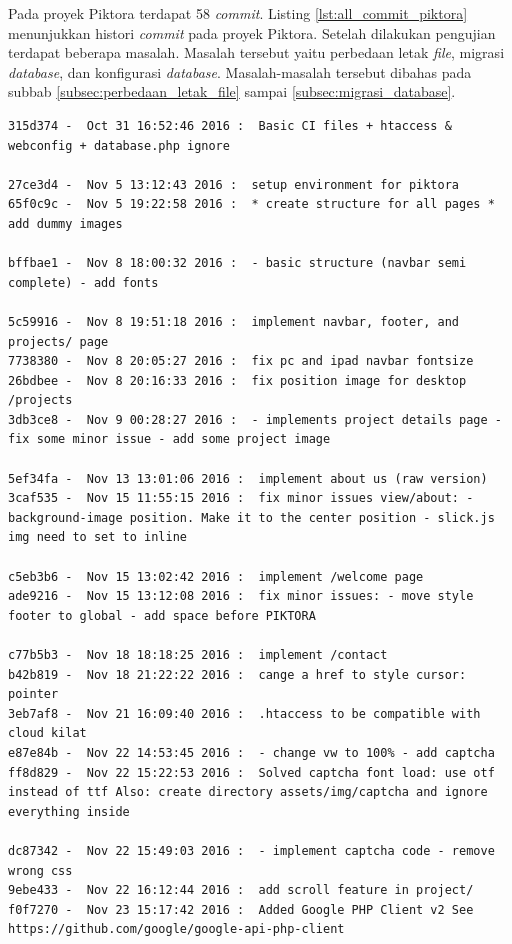 Pada proyek Piktora terdapat 58 \textit{commit}. Listing \ref{lst:all_commit_piktora} menunjukkan histori \textit{commit} pada proyek Piktora. Setelah dilakukan pengujian terdapat beberapa masalah. Masalah tersebut yaitu perbedaan letak \textit{file}, migrasi \textit{database}, dan konfigurasi \textit{database}. Masalah-masalah tersebut dibahas pada subbab \ref{subsec:perbedaan_letak_file} sampai \ref{subsec:migrasi_database}.

\begin{lstlisting}[caption={Histori \textit{commit} pada proyek Piktora},label={lst:all_commit_piktora},language=plaintext]
315d374 -  Oct 31 16:52:46 2016 :  Basic CI files + htaccess & webconfig + database.php ignore

27ce3d4 -  Nov 5 13:12:43 2016 :  setup environment for piktora
65f0c9c -  Nov 5 19:22:58 2016 :  * create structure for all pages * add dummy images

bffbae1 -  Nov 8 18:00:32 2016 :  - basic structure (navbar semi complete) - add fonts

5c59916 -  Nov 8 19:51:18 2016 :  implement navbar, footer, and projects/ page
7738380 -  Nov 8 20:05:27 2016 :  fix pc and ipad navbar fontsize
26bdbee -  Nov 8 20:16:33 2016 :  fix position image for desktop /projects
3db3ce8 -  Nov 9 00:28:27 2016 :  - implements project details page - fix some minor issue - add some project image

5ef34fa -  Nov 13 13:01:06 2016 :  implement about us (raw version)
3caf535 -  Nov 15 11:55:15 2016 :  fix minor issues view/about: - background-image position. Make it to the center position - slick.js img need to set to inline

c5eb3b6 -  Nov 15 13:02:42 2016 :  implement /welcome page
ade9216 -  Nov 15 13:12:08 2016 :  fix minor issues: - move style footer to global - add space before PIKTORA

c77b5b3 -  Nov 18 18:18:25 2016 :  implement /contact
b42b819 -  Nov 18 21:22:22 2016 :  cange a href to style cursor: pointer
3eb7af8 -  Nov 21 16:09:40 2016 :  .htaccess to be compatible with cloud kilat
e87e84b -  Nov 22 14:53:45 2016 :  - change vw to 100% - add captcha
ff8d829 -  Nov 22 15:22:53 2016 :  Solved captcha font load: use otf instead of ttf Also: create directory assets/img/captcha and ignore everything inside

dc87342 -  Nov 22 15:49:03 2016 :  - implement captcha code - remove wrong css
9ebe433 -  Nov 22 16:12:44 2016 :  add scroll feature in project/
f0f7270 -  Nov 23 15:17:42 2016 :  Added Google PHP Client v2 See https://github.com/google/google-api-php-client


\end{lstlisting}
